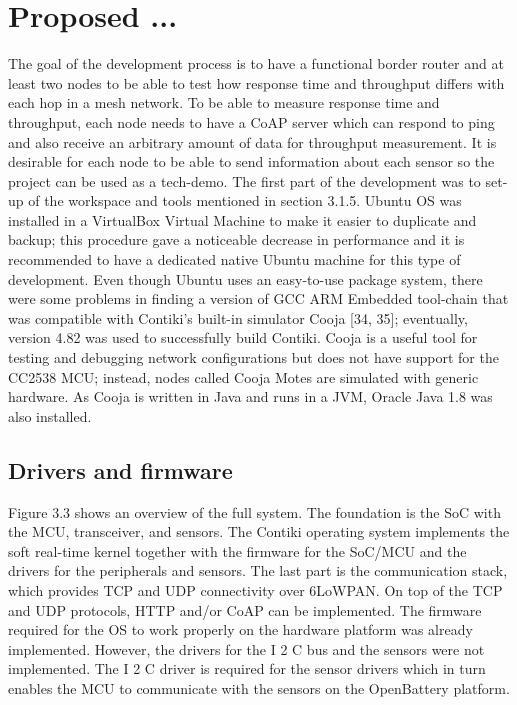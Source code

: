 \section{Proposed ...}

The goal of the development process is to have a functional border router and at least two nodes to be able to test how response time and throughput differs with each hop in a mesh network.
To be able to measure response time and throughput,
	each node needs to have a CoAP server which can respond to ping and also receive an arbitrary amount of data for throughput measurement.
It is desirable for each node to be able to send information about each sensor so the project can be used as a tech-demo.
The first part of the development was to set-up of the workspace and tools mentioned in section 3.1.5.
Ubuntu OS was installed in a VirtualBox Virtual Machine to make it easier to duplicate and backup;
	this procedure gave a noticeable decrease in performance and it is recommended to have a dedicated native Ubuntu machine for this type of development.
Even though Ubuntu uses an easy-to-use package system,
	there were some problems in finding a version of GCC ARM Embedded tool-chain that was compatible with Contiki’s built-in simulator Cooja [34, 35];
	eventually,
	version 4.82 was used to successfully build Contiki.
Cooja is a useful tool for testing and debugging network configurations but does not have support for the CC2538 MCU;
	instead,
	nodes called Cooja Motes are simulated with generic hardware.
As Cooja is written in Java and runs in a JVM,
	Oracle Java 1.8 was also installed.
	
\subsection{Drivers and firmware}

Figure 3.3 shows an overview of the full system.
The foundation is the SoC with the MCU,
	transceiver,
	and sensors.
The Contiki operating system implements the soft real-time kernel together with the firmware for the SoC/MCU and the drivers for the peripherals and sensors.
The last part is the communication stack,
	which provides TCP and UDP connectivity over 6LoWPAN.
On top of the TCP and UDP protocols,
	HTTP and/or CoAP can be implemented.
The firmware required for the OS to work properly on the hardware platform was already implemented.
However,
	the drivers for the I 2 C bus and the sensors were not implemented.
The I 2 C driver is required for the sensor drivers which in turn enables the MCU to communicate with the sensors on the OpenBattery platform.

